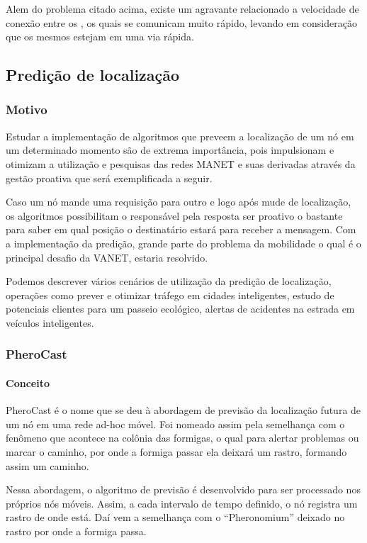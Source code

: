 \documentclass[12pt, %
openright, 
oneside,
a4paper,
brazil]{facom-ufu-abntex2}
\begin{document}
Alem do problema citado acima, existe um agravante relacionado a velocidade de conexão entre os , os quais se comunicam muito rápido, levando em consideração que os mesmos estejam em uma via rápida.

\subsection{Predição de localização}
\subsubsection{Motivo}
Estudar a implementação de algoritmos que preveem a localização de um nó em um determinado momento são de extrema importância, pois impulsionam e otimizam a  utilização e pesquisas das redes MANET e suas derivadas através da gestão proativa que será exemplificada a seguir.  \cite{6838650}

Caso um nó mande uma requisição para outro e logo após mude de localização, os algoritmos possibilitam o responsável pela resposta ser proativo o bastante para saber em qual posição o destinatário estará para receber a mensagem. Com a implementação da predição, grande parte do problema da mobilidade o qual é o principal desafio da VANET, estaria resolvido.

Podemos descrever vários cenários de utilização da predição de localização, operações como prever e otimizar tráfego em cidades inteligentes, estudo de potenciais clientes para um passeio ecológico, alertas de acidentes na estrada em veículos inteligentes.

\subsubsection{PheroCast}
\paragraph{Conceito}
PheroCast é o nome que se deu à abordagem de previsão da localização futura de um nó em uma rede ad-hoc móvel. Foi nomeado assim pela semelhança com o fenômeno que acontece na colônia das formigas, o qual para alertar problemas ou marcar o caminho, por onde a formiga passar ela deixará um rastro, formando assim um caminho.

Nessa abordagem, o algoritmo de previsão é desenvolvido para ser processado nos próprios nós móveis. Assim, a cada intervalo de tempo definido, o nó registra um rastro de onde está. Daí vem a semelhança com o ``Pheronomium'' deixado no rastro por onde a formiga passa.
\end{document}
